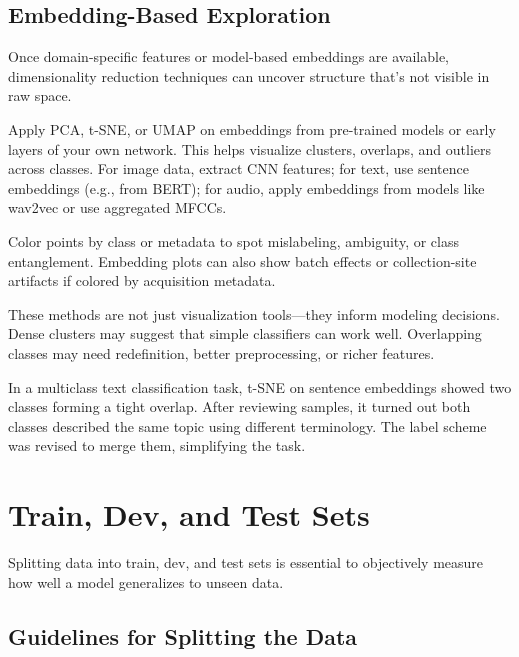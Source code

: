\documentclass[12pt,openany]{book}
\begin{document}
\section{Embedding-Based Exploration}

Once domain-specific features or model-based embeddings are available, dimensionality reduction techniques can uncover structure that’s not visible in raw space.
\newline

Apply PCA, t-SNE, or UMAP on embeddings from pre-trained models or early layers of your own network. This helps visualize clusters, overlaps, and outliers across classes. For image data, extract CNN features; for text, use sentence embeddings (e.g., from BERT); for audio, apply embeddings from models like wav2vec or use aggregated MFCCs.
\newline

Color points by class or metadata to spot mislabeling, ambiguity, or class entanglement. Embedding plots can also show batch effects or collection-site artifacts if colored by acquisition metadata.
\newline

These methods are not just visualization tools—they inform modeling decisions. Dense clusters may suggest that simple classifiers can work well. Overlapping classes may need redefinition, better preprocessing, or richer features.

\begin{examplebox}
In a multiclass text classification task, t-SNE on sentence embeddings showed two classes forming a tight overlap. After reviewing samples, it turned out both classes described the same topic using different terminology. The label scheme was revised to merge them, simplifying the task.
\end{examplebox}




\chapter{Train, Dev, and Test Sets}


Splitting data into train, dev, and test sets is essential to objectively measure how well a model generalizes to unseen data.


\section{Guidelines for Splitting the Data}
\end{document}
